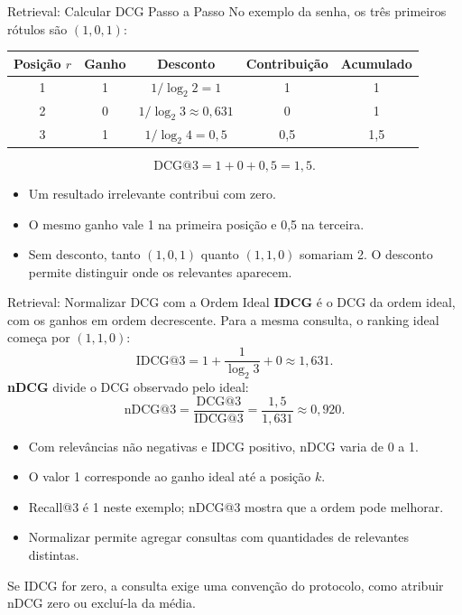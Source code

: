 \documentclass[aspectratio=169, xcolor=dvipsnames]{beamer}
\begin{document}
  \begin{frame}{Retrieval: Calcular DCG Passo a Passo}
    No exemplo da senha, os três primeiros rótulos são $(1,0,1)$:
    \begin{center}
      \begin{tabular}{ccccc}
        \toprule
        Posição $r$ & Ganho & Desconto & Contribuição & Acumulado\\
        \midrule
        1 & 1 & $1/\log_2 2=1$ & 1 & 1\\[0.3em]
        2 & 0 & $1/\log_2 3\approx0{,}631$ & 0 & 1\\[0.3em]
        3 & 1 & $1/\log_2 4=0{,}5$ & 0,5 & 1,5\\
        \bottomrule
      \end{tabular}
    \end{center}
    \[
      \mathrm{DCG@3}=1+0+0{,}5=1{,}5.
    \]
    \begin{itemize}
      \item Um resultado irrelevante contribui com zero.
      \item O mesmo ganho vale 1 na primeira posição e 0,5 na terceira.
      \item Sem desconto, tanto $(1,0,1)$ quanto $(1,1,0)$ somariam 2.
      O desconto permite distinguir onde os relevantes aparecem.
    \end{itemize}
  \end{frame}

  \begin{frame}{Retrieval: Normalizar DCG com a Ordem Ideal}
    \textbf{IDCG} é o DCG da ordem ideal, com os ganhos em ordem decrescente.
    Para a mesma consulta, o ranking ideal começa por $(1,1,0)$:
    \[
      \mathrm{IDCG@3}=1+\frac{1}{\log_2 3}+0\approx1{,}631.
    \]
    \textbf{nDCG} divide o DCG observado pelo ideal:
    \[
      \mathrm{nDCG@3}=\frac{\mathrm{DCG@3}}{\mathrm{IDCG@3}}
        =\frac{1{,}5}{1{,}631}\approx0{,}920.
    \]
    \begin{itemize}
      \item Com relevâncias não negativas e IDCG positivo, nDCG varia de 0 a 1.
      \item O valor 1 corresponde ao ganho ideal até a posição $k$.
      \item Recall@3 é 1 neste exemplo; nDCG@3 mostra que a ordem pode melhorar.
      \item Normalizar permite agregar consultas com quantidades de relevantes distintas.
    \end{itemize}
    \small Se IDCG for zero, a consulta exige uma convenção do protocolo,
    como atribuir nDCG zero ou excluí-la da média.
  \end{frame}
\end{document}
